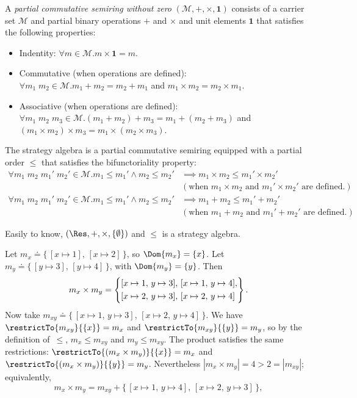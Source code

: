 \begin{definition}\label{def:strategy-semiring}
  A \emph{partial commutative semiring without zero}
  $(\mathcal{M},{+},{\times},\mathbf{1})$ consists of a carrier set $\mathcal{M}$ and partial binary operations ${+}$ and ${\times}$ and unit elements $\mathbf{1}$ that satisfies the following properties:
  \begin{itemize}
  \item Indentity: $\forall m \in \mathcal{M}. m \times \mathbf{1} = m$.
  \item Commutative (when operations are defined): $\forall m_1\;m_2 \in \mathcal{M}. m_1 + m_2 = m_2 + m_1$ and $m_1 \times m_2 = m_2 \times m_1$.
  \item Associative (when operations are defined): $\forall m_1\;m_2\;m_3 \in \mathcal{M}. (m_1 + m_2) + m_3 = m_1 + (m_2 + m_3)$ and $(m_1 \times m_2) \times m_3 = m_1 \times (m_2 \times m_3)$.
  \end{itemize}
The strategy algebra is a partial commutative semiring equipped with a partial order $\leq$ that satisfies the bifunctoriality property:
  \begin{align*}
    \forall m_1\;m_2\;m_1'\;m_2' \in \mathcal{M}. m_1 \leq m_1' \land m_2 \leq m_2' &\implies m_1 \times m_2 \leq m_1' \times m_2' 
    \\& (\text{when } m_1 \times m_2 \text{ and } m_1' \times m_2' \text{ are defined.})
    \\\forall m_1\;m_2\;m_1'\;m_2' \in \mathcal{M}. m_1 \leq m_1' \land m_2 \leq m_2' &\implies m_1 + m_2 \leq m_1' + m_2' 
    \\& (\text{when } m_1 + m_2 \text{ and } m_1' + m_2' \text{ are defined.})
  \end{align*}
  \end{definition}

Easily to know, $(\Res,{+},{\times},\{ \emptyset \})$ and $\leq$ is a strategy algebra.

\begin{example}
Let $m_x \doteq \{\,[x \mapsto 1],\, [x \mapsto 2]\,\}$, so
$\Dom{m_x} = \{x\}$.
Let $m_y \doteq \{\,[y \mapsto 3],\, [y \mapsto 4]\,\}$, with $\Dom{m_y} = \{y\}$.
Then
\[
  m_x \times m_y
  = \left\{
    \begin{array}{@{}l@{}}
      [x \mapsto 1,\, y \mapsto 3],\,
      [x \mapsto 1,\, y \mapsto 4],\\[\jot]
      [x \mapsto 2,\, y \mapsto 3],\,
      [x \mapsto 2,\, y \mapsto 4]
    \end{array}
  \right\}.
\]
Now take
$m_{xy} \doteq \{\, [x \mapsto 1,\, y \mapsto 3],\, [x \mapsto 2,\, y \mapsto 4]\,\}$.
We have
$\restrictTo{m_{xy}}{\{x\}} = m_x$ and $\restrictTo{m_{xy}}{\{y\}} = m_y$,
so by the definition of~$\leq$,
$m_x \leq m_{xy}$ and $m_y \leq m_{xy}$.
The product satisfies the same restrictions:
$\restrictTo{(m_x \times m_y)}{\{x\}} = m_x$ and
$\restrictTo{(m_x \times m_y)}{\{y\}} = m_y$.
Nevertheless $|m_x \times m_y| = 4 > 2 = |m_{xy}|$; equivalently,
\[
  m_x \times m_y
  = m_{xy} + \{\, [x \mapsto 1,\, y \mapsto 4],\, [x \mapsto 2,\, y \mapsto 3] \,\},
\]
\end{example}

